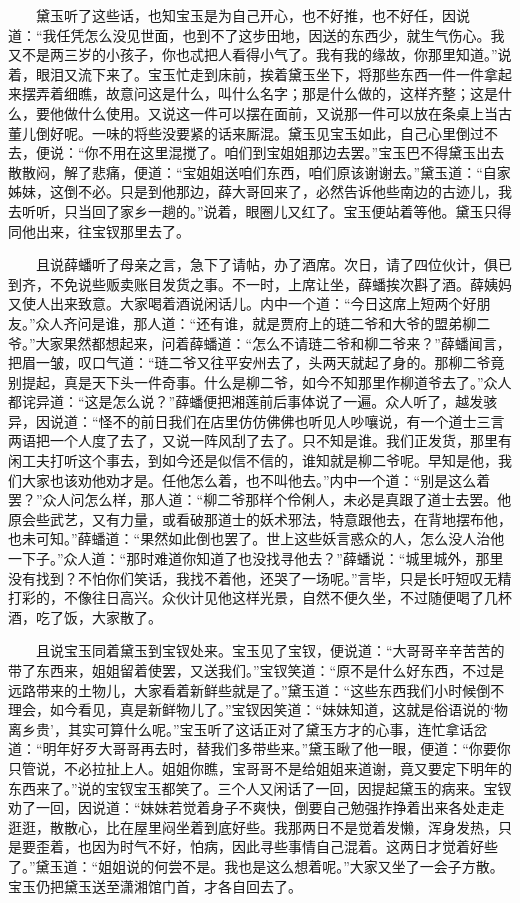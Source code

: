 　　黛玉听了这些话，也知宝玉是为自己开心，也不好推，也不好任，因说道：“我任凭怎么没见世面，也到不了这步田地，因送的东西少，就生气伤心。我又不是两三岁的小孩子，你也忒把人看得小气了。我有我的缘故，你那里知道。”说着，眼泪又流下来了。宝玉忙走到床前，挨着黛玉坐下，将那些东西一件一件拿起来摆弄着细瞧，故意问这是什么，叫什么名字；那是什么做的，这样齐整；这是什么，要他做什么使用。又说这一件可以摆在面前，又说那一件可以放在条桌上当古董儿倒好呢。一味的将些没要紧的话来厮混。黛玉见宝玉如此，自己心里倒过不去，便说：“你不用在这里混搅了。咱们到宝姐姐那边去罢。”宝玉巴不得黛玉出去散散闷，解了悲痛，便道：“宝姐姐送咱们东西，咱们原该谢谢去。”黛玉道：“自家姊妹，这倒不必。只是到他那边，薛大哥回来了，必然告诉他些南边的古迹儿，我去听听，只当回了家乡一趟的。”说着，眼圈儿又红了。宝玉便站着等他。黛玉只得同他出来，往宝钗那里去了。

　　且说薛蟠听了母亲之言，急下了请帖，办了酒席。次日，请了四位伙计，俱已到齐，不免说些贩卖账目发货之事。不一时，上席让坐，薛蟠挨次斟了酒。薛姨妈又使人出来致意。大家喝着酒说闲话儿。内中一个道：“今日这席上短两个好朋友。”众人齐问是谁，那人道：“还有谁，就是贾府上的琏二爷和大爷的盟弟柳二爷。”大家果然都想起来，问着薛蟠道：“怎么不请琏二爷和柳二爷来？”薛蟠闻言，把眉一皱，叹口气道：“琏二爷又往平安州去了，头两天就起了身的。那柳二爷竟别提起，真是天下头一件奇事。什么是柳二爷，如今不知那里作柳道爷去了。”众人都诧异道：“这是怎么说？”薛蟠便把湘莲前后事体说了一遍。众人听了，越发骇异，因说道：“怪不的前日我们在店里仿仿佛佛也听见人吵嚷说，有一个道士三言两语把一个人度了去了，又说一阵风刮了去了。只不知是谁。我们正发货，那里有闲工夫打听这个事去，到如今还是似信不信的，谁知就是柳二爷呢。早知是他，我们大家也该劝他劝才是。任他怎么着，也不叫他去。”内中一个道：“别是这么着罢？”众人问怎么样，那人道：“柳二爷那样个伶俐人，未必是真跟了道士去罢。他原会些武艺，又有力量，或看破那道士的妖术邪法，特意跟他去，在背地摆布他，也未可知。”薛蟠道：“果然如此倒也罢了。世上这些妖言惑众的人，怎么没人治他一下子。”众人道：“那时难道你知道了也没找寻他去？”薛蟠说：“城里城外，那里没有找到？不怕你们笑话，我找不着他，还哭了一场呢。”言毕，只是长吁短叹无精打彩的，不像往日高兴。众伙计见他这样光景，自然不便久坐，不过随便喝了几杯酒，吃了饭，大家散了。

　　且说宝玉同着黛玉到宝钗处来。宝玉见了宝钗，便说道：“大哥哥辛辛苦苦的带了东西来，姐姐留着使罢，又送我们。”宝钗笑道：“原不是什么好东西，不过是远路带来的土物儿，大家看着新鲜些就是了。”黛玉道：“这些东西我们小时候倒不理会，如今看见，真是新鲜物儿了。”宝钗因笑道：“妹妹知道，这就是俗语说的‘物离乡贵’，其实可算什么呢。”宝玉听了这话正对了黛玉方才的心事，连忙拿话岔道：“明年好歹大哥哥再去时，替我们多带些来。”黛玉瞅了他一眼，便道：“你要你只管说，不必拉扯上人。姐姐你瞧，宝哥哥不是给姐姐来道谢，竟又要定下明年的东西来了。”说的宝钗宝玉都笑了。三个人又闲话了一回，因提起黛玉的病来。宝钗劝了一回，因说道：“妹妹若觉着身子不爽快，倒要自己勉强拃挣着出来各处走走逛逛，散散心，比在屋里闷坐着到底好些。我那两日不是觉着发懒，浑身发热，只是要歪着，也因为时气不好，怕病，因此寻些事情自己混着。这两日才觉着好些了。”黛玉道：“姐姐说的何尝不是。我也是这么想着呢。”大家又坐了一会子方散。宝玉仍把黛玉送至潇湘馆门首，才各自回去了。

